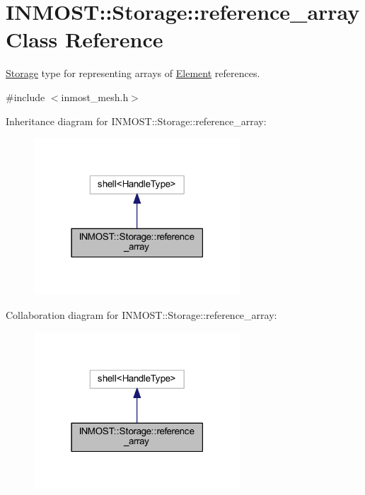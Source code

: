 \hypertarget{classINMOST_1_1Storage_1_1reference__array}{\section{I\-N\-M\-O\-S\-T\-:\-:Storage\-:\-:reference\-\_\-array Class Reference}
\label{classINMOST_1_1Storage_1_1reference__array}
}


\hyperlink{classINMOST_1_1Storage}{Storage} type for representing arrays of \hyperlink{classINMOST_1_1Element}{Element} references.  




{\ttfamily \#include $<$inmost\-\_\-mesh.\-h$>$}



Inheritance diagram for I\-N\-M\-O\-S\-T\-:\-:Storage\-:\-:reference\-\_\-array\-:
\nopagebreak
\begin{figure}[H]
\begin{center}
\leavevmode
\includegraphics[width=219pt]{classINMOST_1_1Storage_1_1reference__array__inherit__graph}
\end{center}
\end{figure}


Collaboration diagram for I\-N\-M\-O\-S\-T\-:\-:Storage\-:\-:reference\-\_\-array\-:
\nopagebreak
\begin{figure}[H]
\begin{center}
\leavevmode
\includegraphics[width=219pt]{classINMOST_1_1Storage_1_1reference__array__coll__graph}
\end{center}
\end{figure}
